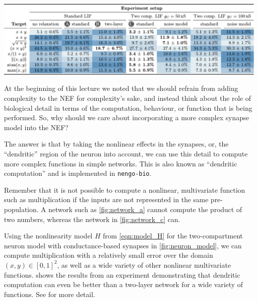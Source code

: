 \documentclass[10pt,letterpaper,oneside]{article}
\begin{document}
\begin{table}
	\caption{Exploring dendritic computation for the three networks in \cref{fig:networks}. Given values are the average normalised RMSE over 256 experiments with 100 neruons per population (200 in the intermediate population for setup \textbf{(b)}). Maximum firing rates between \SIrange{50}{100}{\hertz}. See \cite{stockel2019passive} for details.}
	\label{tbl:result_table}
	\centering
	\includegraphics[width=\textwidth]{media/result_table.pdf}
\end{table}

At the beginning of this lecture we noted that we should refrain from adding complexity to the NEF for complexity's sake, and instead think about the role of biological detail in terms of the computation, behaviour, or function that is being performed. So, why should we care about incorporating a more complex synapse model into the NEF?

The answer is that by taking the nonlinear effects in the synapses, or, the \enquote{dendritic} region of the neuron into account, we can use this detail to compute more complex functions in simple networks. This is also known as \enquote{dendritic computation} \cite{london2005dendritic} and is implemented in \texttt{nengo-bio}.

Remember that it is not possible to compute a nonlinear, multivariate function such as multiplication if the inputs are not represented in the same pre-population. A network such as \cref{fig:network_a} cannot compute the product of two numbers, whereas the network in \cref{fig:network_c} can.

Using the nonlinearity model $H$ from \cref{eqn:model_H} for the two-compartment neuron model with conductance-based synapses in \cref{fig:neuron_model}, we can compute multiplication with a relatively small error over the domain $(x, y) \in [0, 1]^2$, as well as a wide variety of other nonlinear multivariate functions.  shows the results from an experiment demonstrating that dendritic computation can even be better than a two-layer network for a wide variety of functions. See \cite{stockel2019passive} for more detail.

\printbibliography
\end{document}
